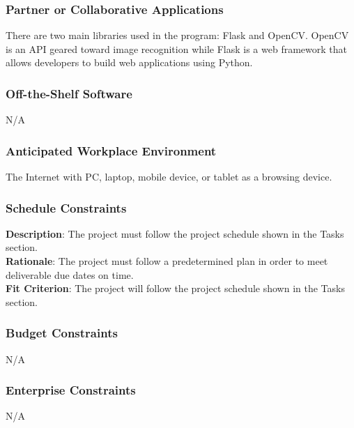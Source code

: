 \documentclass[11pt]{article}
\begin{document}
\subsubsection{Partner or Collaborative Applications}
There are two main libraries used in the program: Flask and OpenCV. OpenCV is an API geared toward image recognition while Flask is a web framework that allows developers to build web applications using Python.

\subsubsection{Off-the-Shelf Software}
N/A

\subsubsection{Anticipated Workplace Environment}
The Internet with PC, laptop, mobile device, or tablet as a browsing device.

\subsubsection{Schedule Constraints}
\textbf{Description}: The project must follow the project schedule shown in the Tasks section.
\\
\textbf{Rationale}: The project must follow a predetermined plan in order to meet deliverable due dates on time.
\\
\textbf{Fit Criterion}: The project will follow the project schedule shown in the Tasks section.

\subsubsection{Budget Constraints}
N/A

\subsubsection{Enterprise Constraints}
N/A
\end{document}
